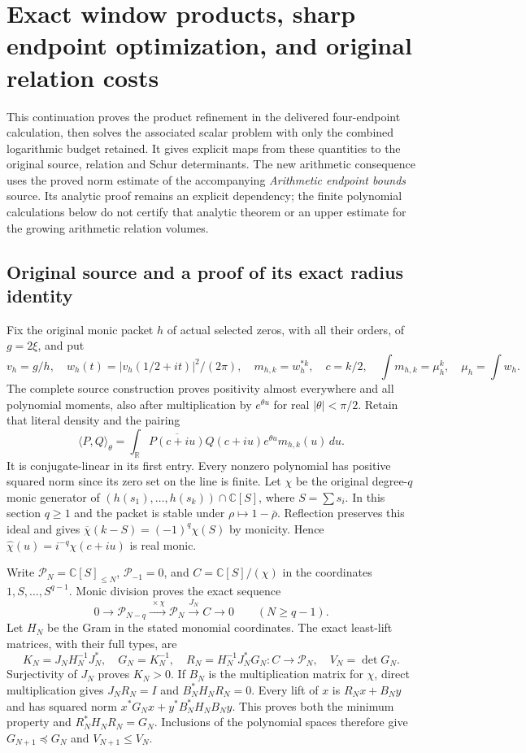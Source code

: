 \begingroup
\def\C{\mathbb C}
\def\R{\mathbb R}
\def\Tr{\operatorname{Tr}}
\def\diag{\operatorname{diag}}
\def\atanh{\operatorname{artanh}}
\section{Exact window products, sharp endpoint optimization, and original relation costs}

This continuation proves the product refinement in the delivered
four-endpoint calculation, then solves the associated scalar problem
with only the combined logarithmic budget retained. It gives explicit
maps from these quantities to the original source, relation and Schur
determinants. The new arithmetic consequence uses the proved norm
estimate of the accompanying \emph{Arithmetic endpoint bounds} source.
Its analytic proof remains an explicit dependency; the finite polynomial
calculations below do not certify that analytic theorem or an upper
estimate for the growing arithmetic relation volumes.

\subsection{Original source and a proof of its exact radius identity}
Fix the original monic packet $h$ of actual selected zeros, with all
their orders, of $g=2\xi$, and put
\[
 v_h=g/h,\quad w_h(t)=|v_h(1/2+it)|^2/(2\pi),\quad
 m_{h,k}=w_h^{*k},\quad c=k/2,
 \quad \int m_{h,k}=\mu_h^k,\quad \mu_h=\int w_h.\tag{EP.1}
\]
The complete source construction proves positivity almost everywhere
and all polynomial moments, also after multiplication by $e^{\theta u}$
for real $|\theta|<\pi/2$. Retain that literal density and the pairing
\[
 \langle P,Q\rangle_\theta=
 \int_\R\overline{P(c+iu)}Q(c+iu)e^{\theta u}m_{h,k}(u)\,du.
 \tag{EP.2}
\]
It is conjugate-linear in its first entry. Every nonzero polynomial has
positive squared norm since its zero set on the line is finite.
Let $\chi$ be the original degree-$q$ monic generator of
$(h(s_1),\ldots,h(s_k))\cap\C[S]$, where $S=\sum s_i$.
In this section $q\ge1$ and the packet is stable under
$\rho\mapsto1-\bar\rho$. Reflection preserves this ideal and gives
$\overline\chi(k-S)=(-1)^q\chi(S)$ by monicity. Hence
$\widehat\chi(u)=i^{-q}\chi(c+iu)$ is real monic.

Write $\mathcal P_N=\C[S]_{\le N}$, $\mathcal P_{-1}=0$, and
$C=\C[S]/(\chi)$ in the coordinates $1,S,\ldots,S^{q-1}$.
Monic division proves the exact sequence
\[
0\longrightarrow\mathcal P_{N-q}\xrightarrow{\,\times\chi\,}
\mathcal P_N\xrightarrow{J_N}C\longrightarrow0\qquad(N\ge q-1).
\tag{EP.3}
\]
Let $H_N$ be the Gram in the stated monomial coordinates. The exact
least-lift matrices, with their full types, are
\[
 K_N=J_NH_N^{-1}J_N^*,\quad G_N=K_N^{-1},\quad
 R_N=H_N^{-1}J_N^*G_N:C\longrightarrow\mathcal P_N,
 \quad V_N=\det G_N.\tag{EP.4}
\]
Surjectivity of $J_N$ proves $K_N>0$. If $B_N$ is the multiplication
matrix for $\chi$, direct multiplication gives $J_NR_N=I$ and
$B_N^*H_NR_N=0$. Every lift of $x$ is $R_Nx+B_Ny$ and has squared
norm $x^*G_Nx+y^*B_N^*H_NB_Ny$. This proves both the minimum
property and $R_N^*H_NR_N=G_N$. Inclusions of the polynomial spaces
therefore give $G_{N+1}\preceq G_N$ and $V_{N+1}\le V_N$.

